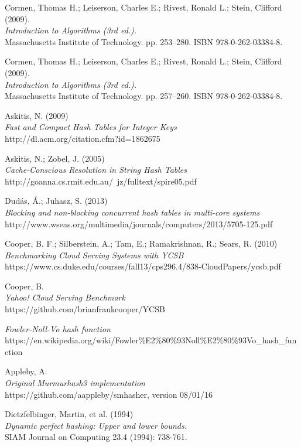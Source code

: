 \documentclass[11pt]{report} %
\begin{document}
\begin{thebibliography}{99}
 Cormen, Thomas H.; Leiserson, Charles E.; Rivest, Ronald L.; Stein, Clifford (2009). \\
 \emph{Introduction to Algorithms (3rd ed.).} \\
 Massachusetts Institute of Technology. pp. 253–280. ISBN 978-0-262-03384-8.

 Cormen, Thomas H.; Leiserson, Charles E.; Rivest, Ronald L.; Stein, Clifford (2009). \\
 \emph{Introduction to Algorithms (3rd ed.).} \\
 Massachusetts Institute of Technology. pp. 257–260. ISBN 978-0-262-03384-8.

 Askitis, N. (2009)\\
 \emph{Fast and Compact Hash Tables for Integer Keys}\\
 http://dl.acm.org/citation.cfm?id=1862675

 Askitis, N.; Zobel, J. (2005)\\
 \emph{Cache-Conscious Resolution in String Hash Tables}
 http://goanna.cs.rmit.edu.au/~jz/fulltext/spire05.pdf

 Dudás, Á.; Juhasz, S. (2013)\\
 \emph{Blocking and non-blocking concurrent hash tables in multi-core systems}\\
 http://www.wseas.org/multimedia/journals/computers/2013/5705-125.pdf

 Cooper, B. F.; Silberstein, A.; Tam, E.; Ramakrishnan, R.; Sears, R. (2010)\\
 \emph{Benchmarking Cloud Serving Systems with YCSB}\\
 https://www.cs.duke.edu/courses/fall13/cps296.4/838-CloudPapers/ycsb.pdf

 Cooper, B.\\
 \emph{Yahoo! Cloud Serving Benchmark}\\
 https://github.com/brianfrankcooper/YCSB

 \emph{Fowler-Noll-Vo hash function}\\
 https://en.wikipedia.org/wiki/Fowler\%E2\%80\%93Noll\%E2\%80\%93Vo\_hash\_function
  
 Appleby, A.\\
 \emph{Original Murmurhash3 implementation}\\
 https://github.com/aappleby/smhasher, version 08/01/16

 Dietzfelbinger, Martin, et al. (1994)\\
 \emph{Dynamic perfect hashing: Upper and lower bounds.}\\
 SIAM Journal on Computing 23.4 (1994): 738-761.


\end{thebibliography}
\end{document}
